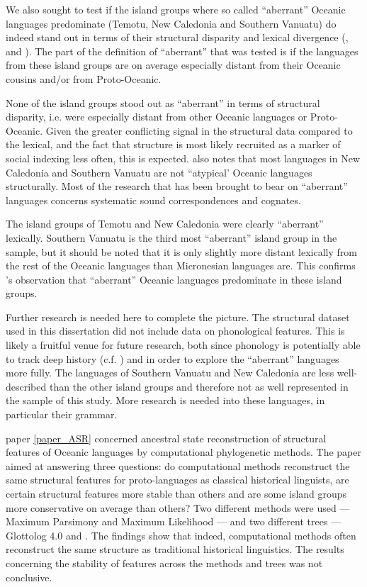 \documentclass[draft,10pt]{article} %
\begin{document}
We also sought to test if the island groups where so called ``aberrant'' Oceanic languages predominate (Temotu, New Caledonia and Southern Vanuatu) do indeed stand out in terms of their structural disparity and lexical divergence (\citet{grace1981indirect}, \citet{grace_1992_aberrant} and \citet{pawley2006explaining}). The part of the definition of ``aberrant'' that was tested is if the languages from these island groups are on average especially distant from their Oceanic cousins and/or from Proto-Oceanic. 

None of the island groups stood out as ``aberrant'' in terms of structural disparity, i.e. were especially distant from other Oceanic languages or Proto-Oceanic. Given the greater conflicting signal in the structural data compared to the lexical, and the fact that structure is most likely recruited as a marker of social indexing less often, this is expected. \citet[219]{pawley2006explaining} also notes that most languages in New Caledonia and Southern Vanuatu are not ``atypical' Oceanic languages structurally. Most of the research that has been brought to bear on ``aberrant'' languages concerns systematic sound correspondences and cognates.

The island groups of Temotu and New Caledonia were clearly ``aberrant'' lexically. Southern Vanuatu is the third most ``aberrant'' island group in the sample, but it should be noted that it is only slightly more distant lexically from the rest of the Oceanic languages than Micronesian languages are. This confirms \citet{pawley2006explaining}'s observation that ``aberrant'' Oceanic languages predominate in these island groups.

Further research is needed here to complete the picture. The structural dataset used in this dissertation did not include data on phonological features. This is likely a fruitful venue for future research, both since phonology is potentially able to track deep history (c.f. \cite{evansaustralia_2019}) and in order to explore the ``aberrant'' languages more fully. The languages of Southern Vanuatu and New Caledonia are less well-described than the other island groups and therefore not as well represented in the sample of this study. More research is needed into these languages, in particular their grammar.

paper \ref{paper_ASR} concerned ancestral state reconstruction of structural features of Oceanic languages by computational phylogenetic methods. The paper aimed at answering three questions: do computational methods reconstruct the same structural features for proto-languages as classical historical linguists, are certain structural features more stable than others and are some island groups more conservative on average than others? Two different methods were used --- Maximum Parsimony and Maximum Likelihood --- and two different trees --- Glottolog 4.0 \citep{glottolog40} and \citet{grayetal_2009}. The findings show that indeed, computational methods often reconstruct the same structure as traditional historical linguistics. The results concerning the stability of features across the methods and trees was not conclusive. 
\end{document}

